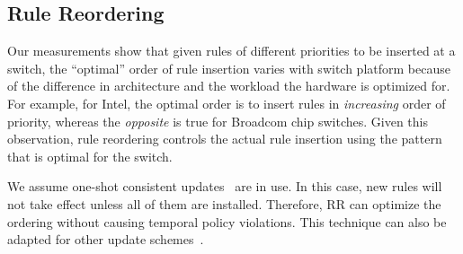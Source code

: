 \subsection{Rule Reordering}
\label{s:optimal}
Our measurements show that given rules of different priorities to be inserted at
a switch, the ``optimal'' order of rule insertion varies with switch platform
because of the difference in architecture and the workload the hardware is
optimized for. For example, for Intel, the optimal order is to insert
rules in \emph{increasing} order of priority, whereas the \emph{opposite} is
true for Broadcom chip switches. Given this observation, rule reordering controls the actual rule
insertion using the pattern that is optimal for the switch. 

We assume one-shot consistent updates~\cite{one-shot} are in use. In this case, new rules will not take effect unless all of them are installed. Therefore, RR can optimize the ordering without causing temporal policy violations. 
This technique can also be adapted for other update schemes~\cite{mahajan13:hotnets}.




